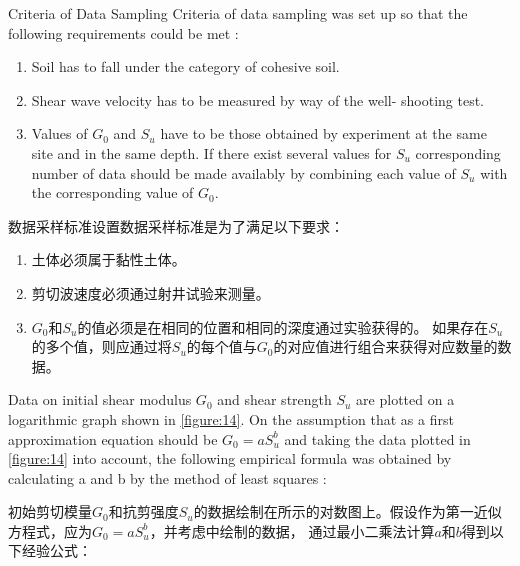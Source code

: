 \begin{paracol}{2}

    Criteria of Data Sampling Criteria of data sampling was set up so that the following requirements could be met : 
    \begin{enumerate}
        \item Soil has to fall under the category of cohesive soil.
        \item Shear wave velocity has to be measured by way of the well- shooting test.
        \item Values of $G_0$ and $S_u$ have to be those obtained by experiment at the same site and in the same depth. If there exist several values for $S_u$ corresponding number of data should be made availably by combining each value of $S_u$ with the corresponding value of $G_0$.
    \end{enumerate}

    \switchcolumn

    数据采样标准设置数据采样标准是为了满足以下要求：
    \begin{enumerate}
        \item 土体必须属于黏性土体。
        \item 剪切波速度必须通过射井试验来测量。
        \item $G_0$和$S_u$的值必须是在相同的位置和相同的深度通过实验获得的。 如果存在$S_u$的多个值，则应通过将$S_u$的每个值与$G_0$的对应值进行组合来获得对应数量的数据。
    \end{enumerate}
    
\end{paracol}


\begin{paracol}{2}
    
    Data on initial shear modulus $G_0$ and shear strength $S_u$ are plotted on a logarithmic graph shown in \autoref{figure:14}. On the assumption that as a first approximation equation should be $G_0=aS_u^b$ and taking the data plotted in \autoref{figure:14} into account, the following empirical formula was obtained by calculating a and b by the method of least squares :

    \switchcolumn

    初始剪切模量$G_0$和抗剪强度$S_u$的数据绘制在所示的对数图上。假设作为第一近似方程式，应为$G_0=aS_u^b$，并考虑中绘制的数据， 通过最小二乘法计算$a$和$b$得到以下经验公式：

\end{paracol}


